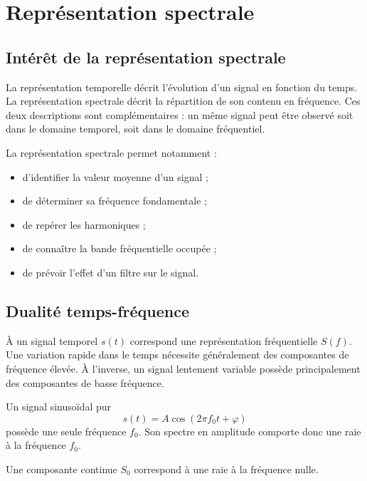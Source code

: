 
\section{Représentation spectrale}\label{sec:elec-spectrale}

\subsection{Intérêt de la représentation spectrale}

La représentation temporelle décrit l'évolution d'un signal en fonction du temps. La représentation spectrale décrit la répartition de son contenu en fréquence. Ces deux descriptions sont complémentaires : un même signal peut être observé soit dans le domaine temporel, soit dans le domaine fréquentiel.

La représentation spectrale permet notamment :
\begin{itemize}
  \item d'identifier la valeur moyenne d'un signal ;
  \item de déterminer sa fréquence fondamentale ;
  \item de repérer les harmoniques ;
  \item de connaître la bande fréquentielle occupée ;
  \item de prévoir l'effet d'un filtre sur le signal.
\end{itemize}

\subsection{Dualité temps-fréquence}

À un signal temporel $s(t)$ correspond une représentation fréquentielle $S(f)$. Une variation rapide dans le temps nécessite généralement des composantes de fréquence élevée. À l'inverse, un signal lentement variable possède principalement des composantes de basse fréquence.

Un signal sinusoïdal pur
\[
s(t)=A\cos(2\pi f_0t+\varphi)
\]
possède une seule fréquence $f_0$. Son spectre en amplitude comporte donc une raie à la fréquence $f_0$.

Une composante continue $S_0$ correspond à une raie à la fréquence nulle.

